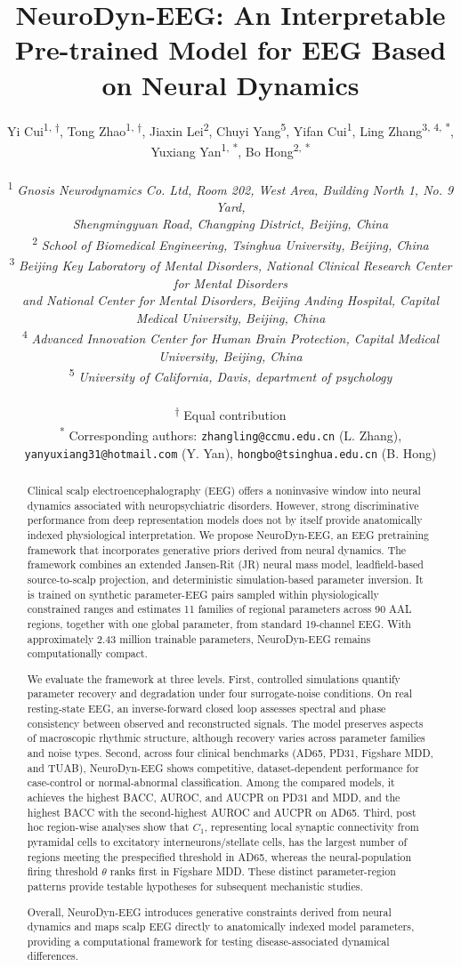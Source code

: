 \documentclass{article}
\date{}
\title{NeuroDyn-EEG: An Interpretable Pre-trained Model for EEG Based on Neural Dynamics}
\author{
  Yi Cui\textsuperscript{1, $\dagger$}, 
  Tong Zhao\textsuperscript{1, $\dagger$}, 
  Jiaxin Lei\textsuperscript{2}, 
  Chuyi Yang\textsuperscript{5}, 
  Yifan Cui\textsuperscript{1}, 
  Ling Zhang\textsuperscript{3, 4, *}, 
  Yuxiang Yan\textsuperscript{1, *}, 
  Bo Hong\textsuperscript{2, *} \\
  \\
  \textsuperscript{1} \textit{Gnosis Neurodynamics Co. Ltd, Room 202, West Area, Building North 1, No. 9 Yard,} \\
  \textit{Shengmingyuan Road, Changping District, Beijing, China} \\
  \textsuperscript{2} \textit{School of Biomedical Engineering, Tsinghua University, Beijing, China} \\
  \textsuperscript{3} \textit{Beijing Key Laboratory of Mental Disorders, National Clinical Research Center for Mental Disorders} \\ 
  \textit{and National Center for Mental Disorders, Beijing Anding Hospital, Capital Medical University, Beijing, China} \\
  \textsuperscript{4} \textit{Advanced Innovation Center for Human Brain Protection, Capital Medical University, Beijing, China} \\
  \textsuperscript{5} \textit{University of California, Davis, department of psychology} \\
  \\
  \textsuperscript{$\dagger$} Equal contribution \\
  \textsuperscript{*} Corresponding authors: \texttt{zhangling@ccmu.edu.cn} (L. Zhang), \\
  \texttt{yanyuxiang31@hotmail.com} (Y. Yan), \texttt{hongbo@tsinghua.edu.cn} (B. Hong)
}
\begin{document}
\maketitle

\begin{abstract}
Clinical scalp electroencephalography (EEG) offers a noninvasive window into neural dynamics associated with neuropsychiatric disorders. However, strong discriminative performance from deep representation models does not by itself provide anatomically indexed physiological interpretation. We propose NeuroDyn-EEG, an EEG pretraining framework that incorporates generative priors derived from neural dynamics. The framework combines an extended Jansen-Rit (JR) neural mass model, leadfield-based source-to-scalp projection, and deterministic simulation-based parameter inversion. It is trained on synthetic parameter-EEG pairs sampled within physiologically constrained ranges and estimates 11 families of regional parameters across 90 AAL regions, together with one global parameter, from standard 19-channel EEG. With approximately 2.43 million trainable parameters, NeuroDyn-EEG remains computationally compact.

We evaluate the framework at three levels. First, controlled simulations quantify parameter recovery and degradation under four surrogate-noise conditions. On real resting-state EEG, an inverse-forward closed loop assesses spectral and phase consistency between observed and reconstructed signals. The model preserves aspects of macroscopic rhythmic structure, although recovery varies across parameter families and noise types. Second, across four clinical benchmarks (AD65, PD31, Figshare MDD, and TUAB), NeuroDyn-EEG shows competitive, dataset-dependent performance for case-control or normal-abnormal classification. Among the compared models, it achieves the highest BACC, AUROC, and AUCPR on PD31 and MDD, and the highest BACC with the second-highest AUROC and AUCPR on AD65. Third, post hoc region-wise analyses show that $C_1$, representing local synaptic connectivity from pyramidal cells to excitatory interneurons/stellate cells, has the largest number of regions meeting the prespecified threshold in AD65, whereas the neural-population firing threshold $\theta$ ranks first in Figshare MDD. These distinct parameter-region patterns provide testable hypotheses for subsequent mechanistic studies.

Overall, NeuroDyn-EEG introduces generative constraints derived from neural dynamics and maps scalp EEG directly to anatomically indexed model parameters, providing a computational framework for testing disease-associated dynamical differences.

\end{abstract}
\end{document}
